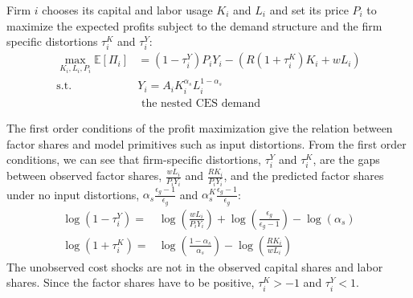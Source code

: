 \documentclass[12pt]{article}
\newcommand{\E}{\mathbb{E}} %
\begin{document}
Firm $i$ chooses its capital and labor usage $K_i$ and $L_i$ and set its price $P_i$ to maximize the expected profits subject to the demand structure and the firm specific distortions $\tau_i^K$ and $\tau_i^Y$: \label{par:clarifyChoiceConstraints}
\begin{align*}
\max_{K_i,L_i,P_i} \E[\Pi_i]&=(1-\tau_i^Y )P_iY_i-(R(1+\tau_i^K)K_i+wL_i)\\
\text{s.t. } &Y_i=A_iK_i^{\alpha_s}L_i^{1-\alpha_s}\\
& \text{ the nested CES demand}
\end{align*}

The first order conditions of the profit maximization give the relation between factor shares and model primitives such as input distortions. From the first order conditions, we can see that firm-specific distortions, $\tau_i^Y$ and $\tau_i^K$, are the gaps between observed factor shares, $\frac{wL_i}{P_iY_i}$ and $\frac{RK_i}{P_iY_i}$, and the predicted factor shares under no input distortions, $\alpha_s\frac{\epsilon_g-1}{\epsilon_g}$ and $\alpha_s^K\frac{\epsilon_g-1}{\epsilon_g}$: 
\begin{align}
\log(1-\tau^Y_i)=&\log\left( \frac{wL_i}{P_iY_i} \right)+\log\left( \frac{\epsilon_g}{\epsilon_g-1} \right)-\log(\alpha_s) \label{Eq:FOCtauY}\\
\log(1+\tau^K_i)=&\log\left( \frac{1-\alpha_s}{\alpha_s} \right)-\log\left( \frac{RK_i}{wL_i} \right) \label{Eq:FOCtauL}
\end{align}
The unobserved cost shocks are not in the observed capital shares and labor shares. Since the factor shares have to be positive, $\tau_i^K>-1$ and $\tau_i^Y<1$.
\end{document}
